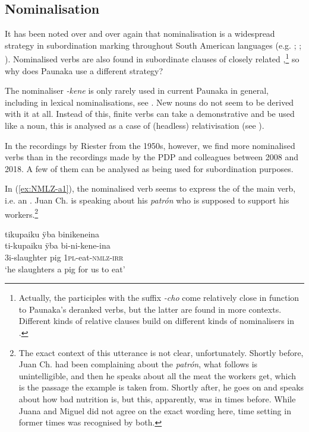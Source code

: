\subsection{Nominalisation}\label{sec:SyntaxNominalisation}

It has been noted over and over again that nominalisation is a widespread strategy in subordination marking throughout South American languages (e.g. \citealt[19]{DerbyshirePullum1986}; \citealt[10--13]{Gijnetal2011}; \citealt[332--334]{Aikhenvald2012}). Nominalised verbs are also found in subordinate clauses of closely related  \citep[]{Danielsen2011a},\footnote{Actually, the  participles with the suffix \textit{-cho} come relatively close in function to Paunaka’s deranked verbs, but the latter are found in more contexts. Different kinds of relative clauses build on different kinds of nominalisers in  \citep[cf.][]{Danielsen2011a}.} so why does Paunaka use a different strategy?

The nominaliser \textit{-kene} is only rarely used in current Paunaka in general, including in lexical nominalisations, see . New nouns do not seem to be derived with it at all. Instead of this, finite verbs can take a demonstrative and be used like a noun, this is analysed as a case of (headless) relativisation (see ).

In the recordings by Riester from the 1950s, however, we find more nominalised verbs than in the recordings made by the PDP and colleagues between 2008 and 2018. A few of them can be analysed as being used for subordination purposes. 

In (\ref{ex:NMLZ-a1}), the nominalised verb seems to express the  of the main verb, i.e. an . Juan Ch. is speaking about his \textit{patrón} who is supposed to support his workers.\footnote{The exact context of this utterance is not clear, unfortunately. Shortly before, Juan Ch. had been complaining about the \textit{patrón}, what follows is unintelligible, and then he speaks about all the meat the workers get, which is the passage the example is taken from. Shortly after, he goes on and speaks about how bad nutrition is, but this, apparently, was in times before. While Juana and Miguel did not agree on the exact wording here, time setting in former times was recognised by both.}

\ea\label{ex:NMLZ-a1}
\begingl
\glpreamble tikupaiku ÿba binikeneina\\
\gla ti-kupaiku ÿba bi-ni-kene-ina\\
\glb 3i-slaughter pig 1\textsc{pl}-eat-\textsc{nmlz}-\textsc{irr}\\
\glft ‘he slaughters a pig for us to eat’
\endgl
\trailingcitation{[nxx-p630101g-2.45]}
\xe


